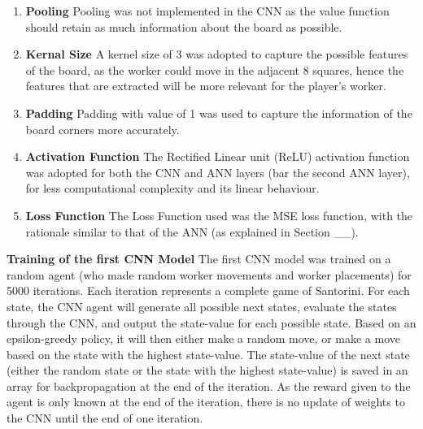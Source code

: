 \documentclass[a4paper,12pt,table]{article}
\begin{document}
\begin{enumerate}
    \item \textbf{Pooling}
    \newline
    Pooling was not implemented in the CNN as the value function should retain as much information about the board as possible. 
    
    \item \textbf{Kernal Size}
    \newline
    A kernel size of 3 was adopted to capture the possible features of the board, as the worker could move in the adjacent 8 squares, hence the features that are extracted will be more relevant for the player’s worker.
    
    \item \textbf{Padding}
    \newline
    Padding with value of 1 was used to capture the information of the board corners more accurately.
    
    \item \textbf{Activation Function}
    \newline
    The Rectified Linear unit (ReLU) activation function was adopted for both the CNN and ANN layers (bar the second ANN layer), for less computational complexity and its linear behaviour.

    \item \textbf{Loss Function}
    \newline
    The Loss Function used was the MSE loss function, with the rationale similar to that of the ANN (as explained in Section \_\_).
\end{enumerate}

\textbf{Training of the first CNN Model}
\newline
The first CNN model was trained on a random agent (who made random worker movements and worker placements) for 5000 iterations. Each iteration represents a complete game of Santorini. For each state, the CNN agent will generate all possible next states, evaluate the states through the CNN, and output the state-value for each possible state. Based on an epsilon-greedy policy, it will then either make a random move, or make a move based on the state with the highest state-value. The state-value of the next state (either the random state or the state with the highest state-value) is saved in an array for backpropagation at the end of the iteration. As the reward given to the agent is only known at the end of the iteration, there is no update of weights to the CNN until the end of one iteration. \par
\end{document}

